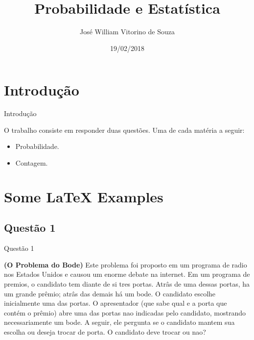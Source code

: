 \documentclass{beamer}
\title[Your Short Title]{Probabilidade e Estatística}
\author{José William Vitorino de Souza}
\institute{IFCE - Aracati}
\date{19/02/2018}
\begin{document}
\begin{frame}
  \titlepage
\end{frame}


\section{Introdução}

\begin{frame}{Introdução}


\begin{block}{}
O trabalho consiste em responder duas questões. Uma de cada matéria a seguir:
\end{block}

\begin{itemize}
  \item Probabilidade.
  \item Contagem.
\end{itemize}

\end{frame}

\section{Some \LaTeX{} Examples}

\subsection{Questão 1}

\begin{frame}{Questão 1}

\textbf{(O Problema do Bode)} Este problema foi proposto em um programa de radio nos Estados Unidos e causou um enorme debate na internet. Em um programa de premios, o candidato tem diante de si tres portas. Atrâs de uma dessas portas, ha um grande prêmio; atrâs das demais há um bode. O candidato escolhe inicialmente uma das portas. O apresentador (que sabe qual e a porta que contém o prêmio) abre uma das portas nao indicadas pelo candidato, mostrando necessariamente um bode. A seguir, ele pergunta se o candidato mantem sua escolha ou deseja trocar de porta. O candidato deve trocar ou nao?

\end{frame}
\end{document}
